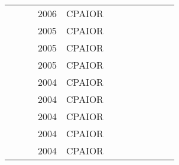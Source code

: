 \documentclass[a4paper]{article}
\begin{document}
{\begin{longtable}{p{3cm}p{6cm}rrcrlcccp{1.5cm}l}
& \href{papers/KovacsV06.pdf}{} & \cite{KovacsV06} & 2006 & CPAIOR & & & & & & & \\
& \href{papers/ChuX05.pdf}{} & \cite{ChuX05} & 2005 & CPAIOR & & & & & & & \\
& \href{papers/FrankK05.pdf}{} & \cite{FrankK05} & 2005 & CPAIOR & & & & & & & \\
& \href{papers/Vilim05.pdf}{} & \cite{Vilim05} & 2005 & CPAIOR & & & & & & & \\
& \href{papers/MaraveliasG04.pdf}{} & \cite{MaraveliasG04} & 2004 & CPAIOR & & & & & & & \\
& \href{papers/ArtiguesBF04.pdf}{} & \cite{ArtiguesBF04} & 2004 & CPAIOR & & & & & & & \\
& \href{papers/HentenryckM04.pdf}{} & \cite{HentenryckM04} & 2004 & CPAIOR & & & & & & & \\
& \href{papers/Vilim04.pdf}{} & \cite{Vilim04} & 2004 & CPAIOR & & & & & & & \\
& \href{papers/Sadykov04.pdf}{} & \cite{Sadykov04} & 2004 & CPAIOR & & & & & & & \\

	  
\end{longtable}
}
\end{document}

